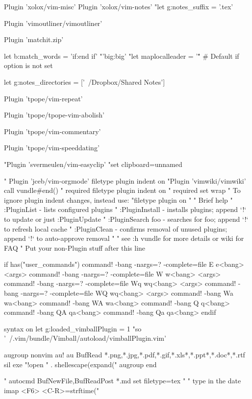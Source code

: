 Plugin 'xolox/vim-misc'
Plugin 'xolox/vim-notes'
"let g:notes_suffix = '.tex'

 Plugin 'vimoutliner/vimoutliner'

Plugin 'matchit.zip'

let b:match_words = 'if:end if'  "'\<big\>:\<big\>'
"let maplocalleader = '\'  " # Default if option is not set

let g:notes_directories = ['~/Dropbox/Shared Notes']

Plugin 'tpope/vim-repeat'


Plugin 'tpope/tpope-vim-abolish'

Plugin 'tpope/vim-commentary'



Plugin 'tpope/vim-speeddating'

"Plugin 'svermeulen/vim-easyclip'
"set clipboard=unnamed



" Plugin 'jceb/vim-orgmode'
filetype plugin indent on
"Plugin 'vimwiki/vimwiki'
call vundle#end()            " required
filetype plugin indent on    " required
set wrap 
" To ignore plugin indent changes, instead use:
"filetype plugin on
"
" Brief help
" :PluginList       - lists configured plugins
" :PluginInstall    - installs plugins; append `!` to update or just :PluginUpdate
" :PluginSearch foo - searches for foo; append `!` to refresh local cache
" :PluginClean      - confirms removal of unused plugins; append `!` to auto-approve removal
"
" see :h vundle for more details or wiki for FAQ
" Put your non-Plugin stuff after this line

if has("user_commands")
    command! -bang -nargs=? -complete=file E e<bang> <args>
    command! -bang -nargs=? -complete=file W w<bang> <args>
    command! -bang -nargs=? -complete=file Wq wq<bang> <args>
    command! -bang -nargs=? -complete=file WQ wq<bang> <args>
    command! -bang Wa wa<bang>
    command! -bang WA wa<bang>
    command! -bang Q q<bang>
    command! -bang QA qa<bang>
    command! -bang Qa qa<bang>
endif



syntax on
let g:loaded_vimballPlugin = 1
"so '~/.vim/bundle/Vimball/autoload/vimballPlugin.vim'

augroup nonvim
   au!
   au BufRead *.png,*.jpg,*.pdf,*.gif,*.xls*,*.ppt*,*.doc*,*.rtf sil exe "!open " . shellescape(expand("%
augroup end

" autocmd BufNewFile,BufReadPost *.md set filetype=tex
"
" type in the date
imap <F6> <C-R>=strftime("%
